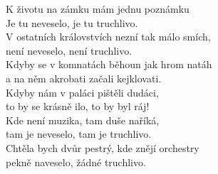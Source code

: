 
\ve{} 
K životu na zámku mám jednu poznámku\\
Je tu neveselo, je tu truchlivo.\\
V ostatních královstvích nezní tak málo smích,\\
není neveselo, není truchlivo.\\

\cho{}
Kdyby se v komnatách běhoun jak hrom natáh\\
a na něm akrobati začali kejklovati.\\
Kdyby nám v paláci pištěli dudáci,\\
to by se krásně ilo, to by byl ráj!\\

\ve{}
Kde není muzika, tam duše naříká,\\
tam je neveselo, tam je truchlivo.\\
Chtěla bych dvůr pestrý, kde znějí orchestry\\
pekně naveselo, žádné truchlivo.\\

\cho{}
\esong